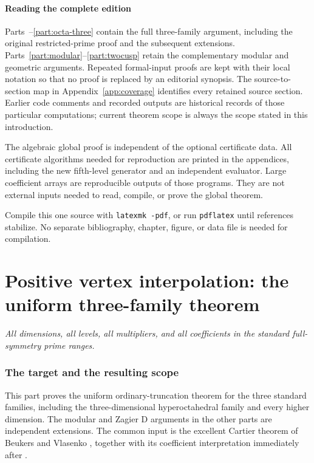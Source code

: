\documentclass[11pt,a4paper]{article}
\theoremstyle{definition}\newtheorem{definition}[theorem]{Definition}
\theoremstyle{remark}\newtheorem{remark}[theorem]{Remark}
\numberwithin{equation}{section}
\newcommand{\partstart}[3]{\clearpage\part{#1}\label{#2}\noindent\textit{#3}\par\medskip}
\begin{document}
\subsection{Reading the complete edition}
Parts~\ref{part:positive}--\ref{part:octa-three} contain the full
three-family argument, including the original restricted-prime proof
and the subsequent extensions. Parts~\ref{part:modular}--\ref{part:twocusp}
retain the complementary modular and geometric arguments. Repeated
formal-input proofs are kept with their local notation so that no
proof is replaced by an editorial synopsis. The source-to-section
map in Appendix~\ref{app:coverage} identifies every retained source
section. Earlier code comments and recorded outputs are historical
records of those particular computations; current theorem scope is
always the scope stated in this introduction.

The algebraic global proof is independent of the optional certificate
data. All certificate algorithms needed for reproduction are printed
in the appendices, including the new fifth-level generator and an
independent evaluator. Large coefficient arrays are reproducible
outputs of those programs. They are not external inputs needed to
read, compile, or prove the global theorem.

Compile this one source with \texttt{latexmk -pdf}, or run
\texttt{pdflatex} until references stabilize. No separate bibliography,
chapter, figure, or data file is needed for compilation.

\partstart{Positive vertex interpolation: the uniform three-family theorem}{part:positive}{All dimensions, all levels, all multipliers, and all coefficients in the standard full-symmetry prime ranges.}
\section{The target and the resulting scope}\label{P:source-main-1}
\label{P:sec:main-scope}

This part proves the uniform ordinary-truncation theorem for the three standard families, including the three-dimensional hyperoctahedral family and every higher dimension. The modular and Zagier D arguments in the other parts are independent extensions. The common input
is the excellent Cartier theorem of Beukers and Vlasenko
\cite[Theorem~7.3]{BV3}, together with its coefficient interpretation
immediately after \cite[Corollary~3.4]{BV3}.
\end{document}
